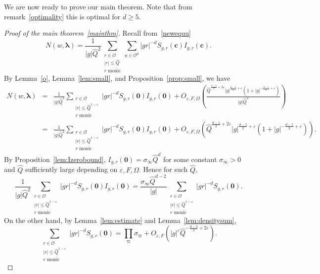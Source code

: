 \documentclass[10pt]{amsart}
\theoremstyle{plain}
\theoremstyle{plain}
\renewcommand{\vec}[1]{\mathbf{#1}}
\theoremstyle{remark}
\theoremstyle{definition}
\renewcommand{\hat}{\widehat}
\newcommand{\hQ}{\widehat{Q}}
\newcommand{\cO}{\mathcal{O}}
\begin{document}
We are now ready to prove our main theorem. Note that from remark~\ref{optimality} this is optimal for $d\geq 5$.
\begin{proof}[Proof of the main theorem~\ref{mainthm}] Recall from~\eqref{newequu}
\begin{equation*}N(w,\boldsymbol{\lambda})=\frac{1}{|g|\hQ^2}\sum_{\substack{
r\in \cO\\
|r|\leq \hat Q\\
\text{$r$ monic}
} }\sum_{\vec{c}\in\mathcal{O}^d}|gr|^{-d}S_{g,r}(\vec{c})I_{g,r}(\vec{c}).\end{equation*}
By Lemma~\ref{o}, Lemma~\ref{lem:small}, and Proposition~\ref{prop:small}, we have
\begin{eqnarray*}N(w,\boldsymbol{\lambda})&=&\frac{1}{|g|\hQ^2}\sum_{\substack{r\in \cO\\|r|\leq \hat Q^{1-\varepsilon}\\ \text{$r$ monic}}}|gr|^{-d}S_{g,r}(\vec{0})I_{g,r}(\vec{0})+O_{\varepsilon, F, \Omega}\left(\frac{\hQ^{\frac{d+3}{2}+2\varepsilon}|g|^{\frac{d-3}{2}+\varepsilon}(1+|g|^{-\frac{d-5}{2}+\varepsilon})}{|g|\hQ^2}\right)\\&=&\frac{1}{|g|\hQ^2}\sum_{\substack{r\in \cO\\|r|\leq \hat Q^{1-\varepsilon}\\ \text{$r$ monic}}}|gr|^{-d}S_{g,r}(\vec{0})I_{g,r}(\vec{0})+O_{\varepsilon, F, \Omega}\left(\hQ^{\frac{d-1}{2}+2\varepsilon}|g|^{\frac{d-5}{2}+\varepsilon}(1+|g|^{-\frac{d-5}{2}+\varepsilon})\right).\end{eqnarray*}
By Proposition~\ref{lem:Izerobound}, $I_{g,r}(\vec{0})=\sigma_{\infty}\hQ^d$ for some constant $\sigma_{\infty}>0$ and $\hQ$ sufficiently large depending on $\varepsilon,F,\Omega$. Hence for such $\hQ$,
\[\frac{1}{|g|\hQ^2}\sum_{\substack{r\in \cO\\|r|\leq \hat Q^{1-\varepsilon}\\ \text{$r$ monic}}}|gr|^{-d}S_{g,r}(\vec{0})I_{g,r}(\vec{0})=\frac{\sigma_{\infty}\hQ^{d-2}}{|g|}\sum_{\substack{r\in \cO\\|r|\leq \hat Q^{1-\varepsilon}\\ \text{$r$ monic}}}|gr|^{-d}S_{g,r}(\vec{0}).\]
On the other hand, by Lemma~\ref{lem:estimate} and Lemma~\ref{lem:densitysum}, 
\[\sum_{\substack{r\in \cO\\|r|\leq \hat Q^{1-\varepsilon}\\ \text{$r$ monic}}}|gr|^{-d}S_{g,r}(\vec{0})=\prod_{\varpi}\sigma_{\varpi}+O_{\varepsilon,F}\left(|g|^{\varepsilon}\hQ^{-\frac{d-3}{2}+2\varepsilon}\right).\]

\end{proof}
\end{document}
